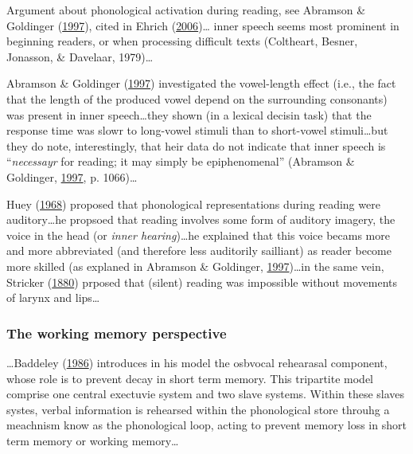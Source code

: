 \documentclass[a4paper,12pt,twoside,openright,oldfontcommands]{memoir}
\begin{document}
Argument about phonological activation during reading, see Abramson \& Goldinger (\protect\hyperlink{ref-abramson_what_1997}{1997}), cited in Ehrich (\protect\hyperlink{ref-ehrich_vygotskian_2006}{2006})\ldots{} inner speech seems most prominent in beginning readers, or when processing difficult texts (Coltheart, Besner, Jonasson, \& Davelaar, 1979)\ldots{}

Abramson \& Goldinger (\protect\hyperlink{ref-abramson_what_1997}{1997}) investigated the vowel-length effect (i.e., the fact that the length of the produced vowel depend on the surrounding consonants) was present in inner speech\ldots they shown (in a lexical decisin task) that the response time was slowr to long-vowel stimuli than to short-vowel stimuli\ldots but they do note, interestingly, that heir data do not indicate that inner speech is \enquote{\emph{necessayr} for reading; it may simply be epiphenomenal} (Abramson \& Goldinger, \protect\hyperlink{ref-abramson_what_1997}{1997}, p. 1066)\ldots{}

Huey (\protect\hyperlink{ref-huey_psychology_1968}{1968}) proposed that phonological representations during reading were auditory\ldots he propsoed that reading involves some form of auditory imagery, the voice in the head (or \emph{inner hearing})\ldots he explained that this voice becams more and more abbreviated (and therefore less auditorily sailliant) as reader become more skilled (as explaned in Abramson \& Goldinger, \protect\hyperlink{ref-abramson_what_1997}{1997})\ldots in the same vein, Stricker (\protect\hyperlink{ref-stricker_studien_1880}{1880}) prposed that (silent) reading was impossible without movements of larynx and lips\ldots{}

\hypertarget{the-working-memory-perspective}{%
\subsubsection{The working memory perspective}\label{the-working-memory-perspective}}

\ldots{}Baddeley (\protect\hyperlink{ref-baddeley_working_1986}{1986}) introduces in his model the osbvocal rehearasal component, whose role is to prevent decay in short term memory. This tripartite model comprise one central exectuvie system and two slave systems. Within these slaves systes, verbal information is rehearsed within the phonological store throuhg a meachnism know as the phonological loop, acting to prevent memory loss in short term memory or working memory\ldots{}
\end{document}
